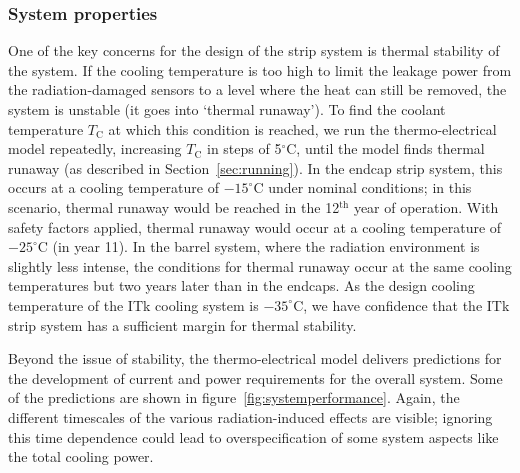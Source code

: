 \subsubsection{System properties}
One of the key concerns for the design of the strip system is thermal stability of the system. If the cooling temperature is too high to limit the leakage power from the radiation-damaged sensors to a level where the heat can still be removed, the system is unstable (it goes into `thermal runaway').
To find the coolant temperature $T_\text{C}$ at which this condition is reached, we run the thermo-electrical model repeatedly, increasing $T_\text{C}$ in steps of 5$^\circ$C, until the model finds thermal runaway (as described in Section~\ref{sec:running}). In the endcap strip system, this occurs at a cooling temperature of $-15^\circ$C under nominal conditions; in this scenario, thermal runaway would be reached in the 12$^\text{th}$ year of operation. With safety factors applied, thermal runaway would occur at a cooling temperature of $-25^\circ$C (in year 11).
In the barrel system, where the radiation environment is slightly less intense, the conditions for thermal runaway occur at the same cooling temperatures but two years later than in the endcaps.
As the design cooling temperature of the ITk cooling system is $-35^\circ$C, we have confidence that the ITk strip system has a sufficient margin for thermal stability.

Beyond the issue of stability, the thermo-electrical model delivers predictions for the development of current and power requirements for the overall system. Some of the predictions are shown in figure~\ref{fig:systemperformance}. Again, the different timescales of the various radiation-induced effects are visible; ignoring this time dependence could lead to overspecification of some system aspects like the total cooling power.


